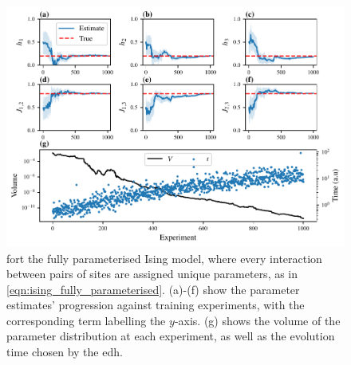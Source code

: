 \begin{figure}
    \begin{center}
        \includegraphics{theoretical_study/figures/fully_param_ising_qhl.pdf}
    \end{center}
    \caption[ for the fully parameterised Ising model]{
         fort the fully parameterised Ising model, 
            where every interaction between pairs of sites are assigned unique parameters, 
            as in \cref{eqn:ising_fully_parameterised}. 
        (a)-(f) show the parameter estimates' progression against training experiments, 
            with the corresponding term labelling the $y$-axis. 
        (g) shows the \gls{volume} of the parameter distribution at each experiment, 
            as well as the evolution time chosen by the \gls{edh}.  
        \figtableref
    }
    \label{fig:ising_fully_parameterised}
\end{figure}

